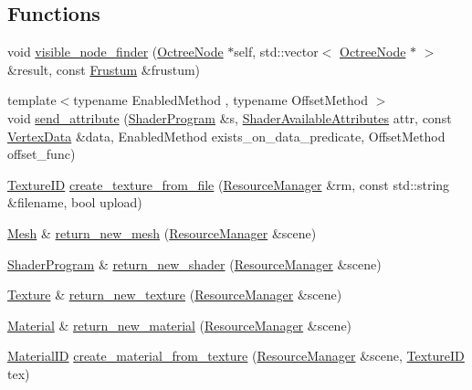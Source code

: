 \subsection*{Functions}
\begin{DoxyCompactItemize}
\item 
void \hyperlink{namespacekglt_a6c7645f2df3e91f9e8498b35791c40b4}{visible\-\_\-node\-\_\-finder} (\hyperlink{classkglt_1_1_octree_node}{Octree\-Node} $\ast$self, std\-::vector$<$ \hyperlink{classkglt_1_1_octree_node}{Octree\-Node} $\ast$ $>$ \&result, const \hyperlink{classkglt_1_1_frustum}{Frustum} \&frustum)
\item 
{\footnotesize template$<$typename Enabled\-Method , typename Offset\-Method $>$ }\\void \hyperlink{namespacekglt_a5a07ff35bb36370cdb8279b6d379cc92}{send\-\_\-attribute} (\hyperlink{classkglt_1_1_shader_program}{Shader\-Program} \&s, \hyperlink{namespacekglt_a402d09e4a0c30dbb100d563c0a3d945a}{Shader\-Available\-Attributes} attr, const \hyperlink{classkglt_1_1_vertex_data}{Vertex\-Data} \&data, Enabled\-Method exists\-\_\-on\-\_\-data\-\_\-predicate, Offset\-Method offset\-\_\-func)
\item 
\hyperlink{namespacekglt_aaea040f25edb7f75ca0f3aa8136a45a1}{Texture\-I\-D} \hyperlink{namespacekglt_ad68d623724c2156164e9a12f20269839}{create\-\_\-texture\-\_\-from\-\_\-file} (\hyperlink{classkglt_1_1_resource_manager}{Resource\-Manager} \&rm, const std\-::string \&filename, bool upload)
\item 
\hyperlink{classkglt_1_1_mesh}{Mesh} \& \hyperlink{namespacekglt_ae269cb8c13ded866f8d9c79ad5448283}{return\-\_\-new\-\_\-mesh} (\hyperlink{classkglt_1_1_resource_manager}{Resource\-Manager} \&scene)
\item 
\hyperlink{classkglt_1_1_shader_program}{Shader\-Program} \& \hyperlink{namespacekglt_a528eed3bf4c0f48696238482db66d9c4}{return\-\_\-new\-\_\-shader} (\hyperlink{classkglt_1_1_resource_manager}{Resource\-Manager} \&scene)
\item 
\hyperlink{classkglt_1_1_texture}{Texture} \& \hyperlink{namespacekglt_a8cbfda0108ec18533206d0abbfb55069}{return\-\_\-new\-\_\-texture} (\hyperlink{classkglt_1_1_resource_manager}{Resource\-Manager} \&scene)
\item 
\hyperlink{classkglt_1_1_material}{Material} \& \hyperlink{namespacekglt_af40f94c1ac71a6a4138d18ac6edb0b21}{return\-\_\-new\-\_\-material} (\hyperlink{classkglt_1_1_resource_manager}{Resource\-Manager} \&scene)
\item 
\hyperlink{namespacekglt_a5ffac6377a7d3e163b4d5c31f71db43a}{Material\-I\-D} \hyperlink{namespacekglt_ad5dafbb5903a02f750a168ed814c352c}{create\-\_\-material\-\_\-from\-\_\-texture} (\hyperlink{classkglt_1_1_resource_manager}{Resource\-Manager} \&scene, \hyperlink{namespacekglt_aaea040f25edb7f75ca0f3aa8136a45a1}{Texture\-I\-D} tex)
\end{DoxyCompactItemize}
